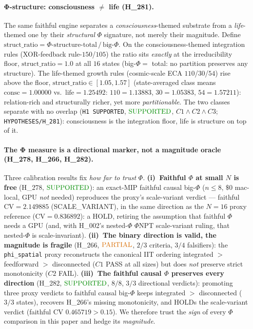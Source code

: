 \documentclass[11pt]{article}
\begin{document}
\paragraph{Φ-structure: consciousness $\ne$ life (H\_281).} The same faithful
engine separates a \emph{consciousness}-themed substrate from a \emph{life}-themed
one by their \emph{structural} $\Phi$ signature, not merely their magnitude. Define
$\mathrm{struct\_ratio} = \Phi\text{-structure-total}\,/\,\text{big-}\Phi$. On the
consciousness-themed integration rules (XOR-feedback rule-$150$/$105$) the ratio sits
\emph{exactly} at the irreducibility floor, $\mathrm{struct\_ratio}=\mathbf{1.0}$ at
all $16$ states (big-$\Phi=$ total: no partition preserves any structure). The
life-themed growth rules (cosmic-scale ECA $110$/$30$/$54$) rise above the floor,
$\mathrm{struct\_ratio}\in[\mathbf{1.05},\mathbf{1.57}]$ (state-averaged class means
$\text{consc}=\mathbf{1.00000}$ vs.\ $\text{life}=\mathbf{1.25492}$: $110{=}1.13883$,
$30{=}1.05383$, $54{=}1.57211$): relation-rich and structurally richer, yet more
\emph{partitionable}. The two classes separate with no overlap (\texttt{H1 SUPPORTED},
$\mathbf{\textcolor{green!55!black}{\text{SUPPORTED}}}$, $C1\wedge C2\wedge C3$;
\texttt{HYPOTHESES/H\_281}): consciousness is the integration floor, life is structure
on top of it.

\paragraph{The Φ measure is a directional marker, not a magnitude oracle
(H\_278, H\_266, H\_282).} Three calibration results fix \emph{how far to trust}
$\Phi$. \textbf{(i)~Faithful $\Phi$ at small $N$ is free} (H\_278,
$\mathbf{\textcolor{green!55!black}{\text{SUPPORTED}}}$): an exact-MIP faithful causal
big-$\Phi$ ($n{\le}8$, $\$0$ mac-local, GPU \emph{not} needed) reproduces the proxy's
scale-variant verdict --- faithful $\mathrm{CV}=\mathbf{2.149885}$ (SCALE\_VARIANT),
in the same direction as the $N{=}16$ proxy reference ($\mathrm{CV}=0.836892$): a HOLD,
retiring the assumption that faithful $\Phi$ needs a GPU (and, with H\_002's nested-$\Phi$
$\Phi$NPT scale-variant ruling, that nested-$\Phi$ is scale-invariant). \textbf{(ii)~The
binary direction is valid, the magnitude is fragile} (H\_266,
$\mathbf{\textcolor{orange!85!black}{\text{PARTIAL}}}$, $2/3$ criteria, $3/4$
falsifiers): the \texttt{phi\_spatial} proxy reconstructs the canonical IIT ordering
integrated $>$ feedforward $>$ disconnected ($C1$ PASS at all sizes) but does \emph{not}
preserve strict monotonicity ($C2$ FAIL). \textbf{(iii)~The faithful causal $\Phi$
preserves every direction} (H\_282, $\mathbf{\textcolor{green!55!black}{\text{SUPPORTED}}}$,
$8/8$, $3/3$ directional verdicts): promoting three proxy verdicts to faithful causal
big-$\Phi$ keeps integrated $>$ disconnected ($3/3$ states), recovers H\_266's missing
monotonicity, and HOLDs the scale-variant verdict (faithful CV $0.465719>0.15$). We
therefore trust the \emph{sign} of every $\Phi$ comparison in this paper and hedge its
\emph{magnitude}.
\end{document}
